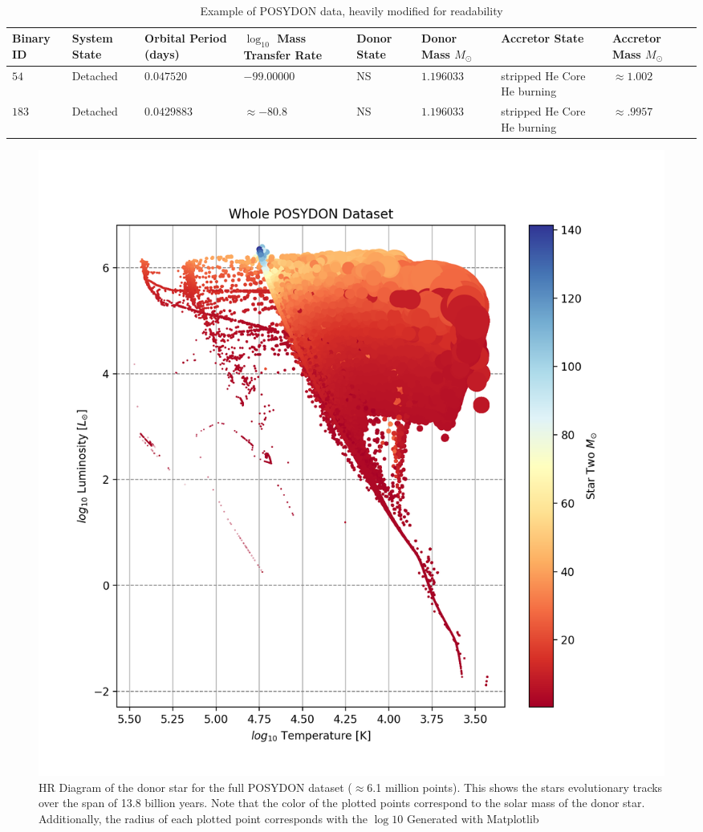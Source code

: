 \documentclass[12pt, a4paper]{article}
\begin{document}
         \begin{table}
            \centering\
            \footnotesize
            \begin{tabularx}{\textwidth}{||X | X | X | X | X | X | X | X ||}
                \hline 
                \textbf{Binary ID} & 
                \textbf{System State} & 
                \textbf{Orbital Period (days)} & 
                \boldmath$\log_{10}$ \textbf{Mass Transfer Rate} & 
                \textbf{Donor State} & 
                \textbf{Donor Mass} $M_\odot$ & 
                \textbf{Accretor State} & 
                \textbf{Accretor Mass} $M_\odot$
                \\ \hline \hline
                $54$ & Detached & $0.047520$ & $-99.00000$ & NS & $1.196033$ & stripped He Core He burning & $\approx 1.002$ \\
                \hline
                $183$ & Detached & $0.0429883$ & $ \approx -80.8$ & NS & $1.196033$ & stripped He Core He burning & $\approx .9957$ \\
                \hline
            \end{tabularx}
            \caption{Example of POSYDON data, heavily modified for readability}
            \label{POSYDONDataExample}
        \end{table}

        \begin{figure} [H]
            \centering
            \includegraphics[width = \textwidth]{figs/GeneratedFigs/WholePOSYDONDatasetExample.png}
            \caption{HR Diagram of the donor star for the full POSYDON dataset ($\approx$6.1 million points). This shows the stars evolutionary tracks over the span of 13.8 billion years. Note that the color of the plotted points correspond to the solar mass of the donor star. Additionally, the radius of each plotted point corresponds with the $\log{10}$ Generated with Matplotlib}
            \label{EntireDataSetHR}
        \end{figure}
\end{document}

